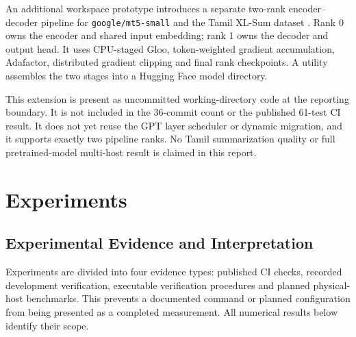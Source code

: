 An additional workspace prototype introduces a separate two-rank encoder--decoder pipeline for \texttt{google/mt5-small} and the Tamil XL-Sum dataset \cite{mt5,xlsum}. Rank 0 owns the encoder and shared input embedding; rank 1 owns the decoder and output head. It uses CPU-staged Gloo, token-weighted gradient accumulation, Adafactor, distributed gradient clipping and final rank checkpoints. A utility assembles the two stages into a Hugging Face model directory.

This extension is present as uncommitted working-directory code at the reporting boundary. It is not included in the 36-commit count or the published 61-test CI result. It does not yet reuse the GPT layer scheduler or dynamic migration, and it supports exactly two pipeline ranks. No Tamil summarization quality or full pretrained-model multi-host result is claimed in this report.

\section{Experiments}

\subsection{Experimental Evidence and Interpretation}

Experiments are divided into four evidence types: published CI checks, recorded development verification, executable verification procedures and planned physical-host benchmarks. This prevents a documented command or planned configuration from being presented as a completed measurement. All numerical results below identify their scope.

